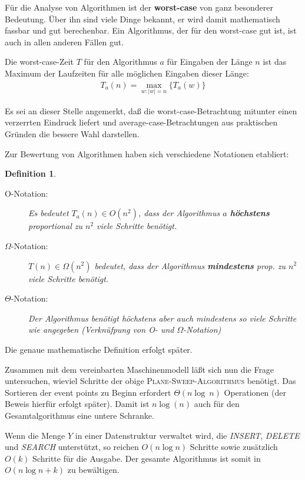 \documentclass[ngerman,draft,parskip=half*,twoside]{scrreprt}
\theoremstyle{break}
\newtheorem{definition}{Definition}
\begin{document}
Für die Analyse von Algorithmen ist der \textbf{worst-case} von ganz
besonderer Bedeutung. Über ihn sind viele Dinge bekannt, er wird
damit mathematisch fassbar und gut berechenbar. Ein Algorithmus,
der für den worst-case gut ist, ist auch in allen anderen Fällen gut.

Die worst-case-Zeit $T$ für den Algorithmus $a$ für Eingaben der Länge $n$
ist das Maximum der Laufzeiten für alle möglichen Eingaben dieser
Länge:
\begin{gather*}
  T_a(n) = \max_{w\colon |w|=n}\big\{T_a(w)\big\}
\end{gather*}

Es sei an dieser Stelle angemerkt, daß die worst-case-Betrachtung mitunter
einen verzerrten Eindruck liefert und average-case-Betrachtungen aus
praktischen Gründen die bessere Wahl darstellen.

Zur Bewertung von Algorithmen haben sich verschiedene Notationen
etabliert:
\begin{definition}
  \begin{description}
   \item[O-Notation:]
    Es bedeutet $T_a(n) \in O(n^2)$, dass der Algorithmus $a$
    \textbf{höchstens} proportional zu $n^2$ viele Schritte benötigt. 
   \item[$\Omega$-Notation:]
    $T(n) \in \Omega (n^2)$ bedeutet, dass der Algorithmus \textbf{mindestens}
    prop. zu $n^2$ viele Schritte benötigt. 
   \item[$\Theta$-Notation:]
    Der Algorithmus benötigt höchstens aber auch mindestens so viele
    Schritte wie angegeben (Verknüfpung von O- und $\Omega$-Notation)
  \end{description}
\end{definition}
Die genaue mathematische Definition erfolgt später.

Zusammen mit dem vereinbarten
Maschinenmodell läßt sich nun die Frage untersuchen, wieviel Schritte
der obige \textsc{Plane-Sweep-Algorithmus} benötigt.
Das Sortieren der event points zu Beginn erfordert $\Theta(n\log~n)$
Operationen (der Beweis hierfür erfolgt später). Damit ist $n\log(n)$
auch für den Gesamtalgorithmus eine untere Schranke.

Wenn die Menge $Y$ in einer Datenstruktur verwaltet wird, die 
\textit{INSERT}, \textit{DELETE} und \textit{SEARCH} unterstützt, so
reichen $O(n \log n)$ Schritte sowie zusätzlich $O(k)$ Schritte für
die Ausgabe. Der gesamte Algorithmus ist somit in $O(n\log n+k)$ zu
bewältigen.
\end{document}
